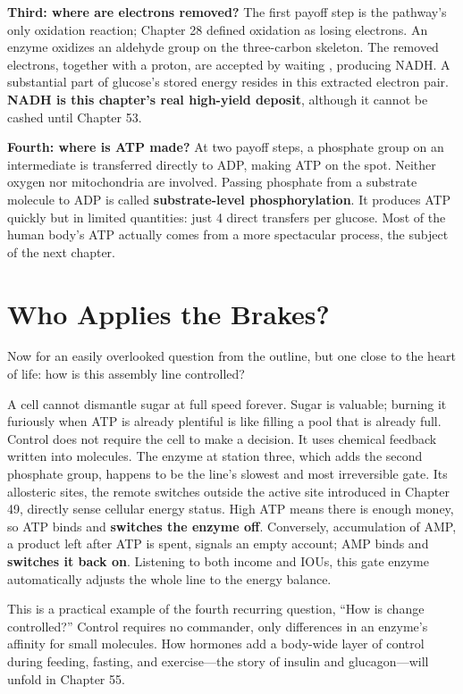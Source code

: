 \textbf{Third: where are electrons removed?} The first payoff step is the pathway's only oxidation reaction; Chapter 28 defined oxidation as losing electrons. An enzyme oxidizes an aldehyde group on the three-carbon skeleton. The removed electrons, together with a proton, are accepted by waiting , producing NADH. A substantial part of glucose's stored energy resides in this extracted electron pair. \textbf{NADH is this chapter's real high-yield deposit}, although it cannot be cashed until Chapter 53.

\textbf{Fourth: where is ATP made?} At two payoff steps, a phosphate group on an intermediate is transferred directly to ADP, making ATP on the spot. Neither oxygen nor mitochondria are involved. Passing phosphate from a substrate molecule to ADP is called \textbf{substrate-level phosphorylation}. It produces ATP quickly but in limited quantities: just 4 direct transfers per glucose. Most of the human body's ATP actually comes from a more spectacular process, the subject of the next chapter.

\section{Who Applies the Brakes?}

Now for an easily overlooked question from the outline, but one close to the heart of life: how is this assembly line controlled?

A cell cannot dismantle sugar at full speed forever. Sugar is valuable; burning it furiously when ATP is already plentiful is like filling a pool that is already full. Control does not require the cell to make a decision. It uses chemical feedback written into molecules. The enzyme at station three, which adds the second phosphate group, happens to be the line's slowest and most irreversible gate. Its allosteric sites, the remote switches outside the active site introduced in Chapter 49, directly sense cellular energy status. High ATP means there is enough money, so ATP binds and \textbf{switches the enzyme off}. Conversely, accumulation of AMP, a product left after ATP is spent, signals an empty account; AMP binds and \textbf{switches it back on}. Listening to both income and IOUs, this gate enzyme automatically adjusts the whole line to the energy balance.

This is a practical example of the fourth recurring question, ``How is change controlled?'' Control requires no commander, only differences in an enzyme's affinity for small molecules. How hormones add a body-wide layer of control during feeding, fasting, and exercise---the story of insulin and glucagon---will unfold in Chapter 55.

